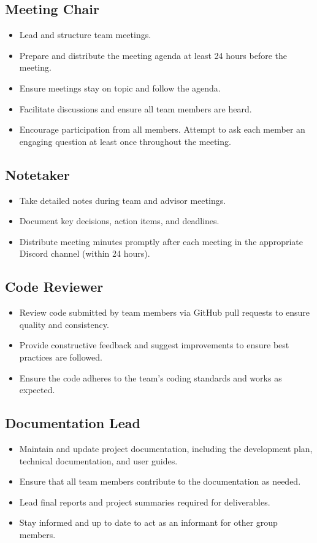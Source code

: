 \documentclass{article}
\begin{document}
\subsection{Meeting Chair} 
  \begin{itemize}
    \item Lead and structure team meetings.
    \item Prepare and distribute the meeting agenda at least 24 hours before the meeting.
    \item Ensure meetings stay on topic and follow the agenda.
    \item Facilitate discussions and ensure all team members are heard.
    \item Encourage participation from all members. Attempt to ask each member an engaging question at least once throughout the meeting.
  \end{itemize}

\subsection{Notetaker}
  \begin{itemize}
    \item Take detailed notes during team and advisor meetings.
    \item Document key decisions, action items, and deadlines.
    \item Distribute meeting minutes promptly after each meeting in the appropriate Discord channel (within 24 hours).
  \end{itemize}

  \subsection{Code Reviewer}
  \begin{itemize}
    \item Review code submitted by team members via GitHub pull requests to ensure quality and consistency.
    \item Provide constructive feedback and suggest improvements to ensure best practices are followed.
    \item Ensure the code adheres to the team's coding standards and works as expected.
  \end{itemize}

\subsection{Documentation Lead}
  \begin{itemize}
    \item Maintain and update project documentation, including the development plan, technical documentation, and user guides.
    \item Ensure that all team members contribute to the documentation as needed.
    \item Lead final reports and project summaries required for deliverables.
    \item Stay informed and up to date to act as an informant for other group members.
  \end{itemize}
\end{document}
